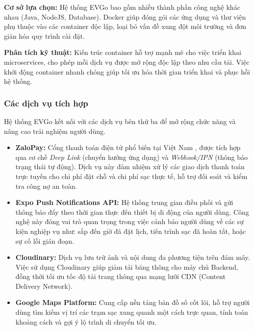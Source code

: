 \textbf{Cơ sở lựa chọn:}
Hệ thống EVGo bao gồm nhiều thành phần công nghệ khác nhau (Java, NodeJS, Database). Docker giúp đóng gói các ứng dụng và thư viện phụ thuộc vào các container độc lập, loại bỏ vấn đề xung đột môi trường và đơn giản hóa quy trình cài đặt.

\textbf{Phân tích kỹ thuật:}
Kiến trúc container hỗ trợ mạnh mẽ cho việc triển khai microservices, cho phép mỗi dịch vụ được mở rộng độc lập theo nhu cầu tải. Việc khởi động container nhanh chóng giúp tối ưu hóa thời gian triển khai và phục hồi hệ thống.

\subsubsection{Các dịch vụ tích hợp}
Hệ thống EVGo kết nối với các dịch vụ bên thứ ba để mở rộng chức năng và nâng cao trải nghiệm người dùng.

\begin{itemize}
    \item \textbf{ZaloPay:} Cổng thanh toán điện tử phổ biến tại Việt Nam \cite{zalopay_docs}, được tích hợp qua cơ chế \textit{Deep Link} (chuyển hướng ứng dụng) và \textit{Webhook/IPN} (thông báo trạng thái tự động). Dịch vụ này đảm nhiệm xử lý các giao dịch thanh toán trực tuyến cho chi phí đặt chỗ và chi phí sạc thực tế, hỗ trợ đối soát và kiểm tra công nợ an toàn.
    \item \textbf{Expo Push Notifications API:} Hệ thống trung gian điều phối và gửi thông báo đẩy \cite{expo_push} theo thời gian thực đến thiết bị di động của người dùng. Công nghệ này đóng vai trò quan trọng trong việc cảnh báo người dùng về các sự kiện nghiệp vụ như: sắp đến giờ đã đặt lịch, tiến trình sạc đã hoàn tất, hoặc sự cố lỗi gián đoạn.
    \item \textbf{Cloudinary:} Dịch vụ lưu trữ ảnh và nội dung đa phương tiện trên đám mây. Việc sử dụng Cloudinary giúp giảm tải băng thông cho máy chủ Backend, đồng thời tối ưu tốc độ tải trang thông qua mạng lưới CDN (Content Delivery Network).
    \item \textbf{Google Maps Platform:} Cung cấp nền tảng bản đồ số cốt lõi, hỗ trợ người dùng tìm kiếm vị trí các trạm sạc xung quanh một cách trực quan, tính toán khoảng cách và gợi ý lộ trình di chuyển tối ưu.
\end{itemize}
